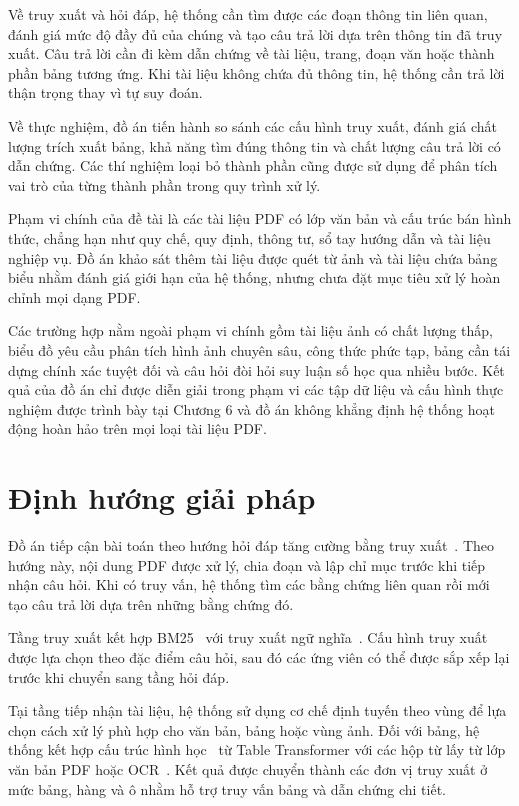 \documentclass[../DoAn.tex]{subfiles}
\begin{document}
Về truy xuất và hỏi đáp, hệ thống cần tìm được các đoạn thông tin liên quan, đánh giá mức độ đầy đủ của chúng và tạo câu trả lời dựa trên thông tin đã truy xuất. Câu trả lời cần đi kèm dẫn chứng về tài liệu, trang, đoạn văn hoặc thành phần bảng tương ứng. Khi tài liệu không chứa đủ thông tin, hệ thống cần trả lời thận trọng thay vì tự suy đoán.

Về thực nghiệm, đồ án tiến hành so sánh các cấu hình truy xuất, đánh giá chất lượng trích xuất bảng, khả năng tìm đúng thông tin và chất lượng câu trả lời có dẫn chứng. Các thí nghiệm loại bỏ thành phần cũng được sử dụng để phân tích vai trò của từng thành phần trong quy trình xử lý.

Phạm vi chính của đề tài là các tài liệu PDF có lớp văn bản và cấu trúc bán hình thức, chẳng hạn như quy chế, quy định, thông tư, sổ tay hướng dẫn và tài liệu nghiệp vụ. Đồ án khảo sát thêm tài liệu được quét từ ảnh và tài liệu chứa bảng biểu nhằm đánh giá giới hạn của hệ thống, nhưng chưa đặt mục tiêu xử lý hoàn chỉnh mọi dạng PDF.

Các trường hợp nằm ngoài phạm vi chính gồm tài liệu ảnh có chất lượng thấp, biểu đồ yêu cầu phân tích hình ảnh chuyên sâu, công thức phức tạp, bảng cần tái dựng chính xác tuyệt đối và câu hỏi đòi hỏi suy luận số học qua nhiều bước. Kết quả của đồ án chỉ được diễn giải trong phạm vi các tập dữ liệu và cấu hình thực nghiệm được trình bày tại Chương 6 và đồ án không khẳng định hệ thống hoạt động hoàn hảo trên mọi loại tài liệu PDF.

\section{Định hướng giải pháp}



Đồ án tiếp cận bài toán theo hướng hỏi đáp tăng cường bằng truy xuất~\cite{lewis2020rag}. Theo hướng này, nội dung PDF được xử lý, chia đoạn và lập chỉ mục trước khi tiếp nhận câu hỏi. Khi có truy vấn, hệ thống tìm các bằng chứng liên quan rồi mới tạo câu trả lời dựa trên những bằng chứng đó.

Tầng truy xuất kết hợp BM25~\cite{robertson2009bm25} với truy xuất ngữ nghĩa~\cite{karpukhin2020dpr}. Cấu hình truy xuất được lựa chọn theo đặc điểm câu hỏi, sau đó các ứng viên có thể được sắp xếp lại trước khi chuyển sang tầng hỏi đáp.

Tại tầng tiếp nhận tài liệu, hệ thống sử dụng cơ chế định tuyến theo vùng để lựa chọn cách xử lý phù hợp cho văn bản, bảng hoặc vùng ảnh. Đối với bảng, hệ thống kết hợp cấu trúc hình học~\cite{smock2022pubtables} từ Table Transformer với các hộp từ lấy từ lớp văn bản PDF hoặc OCR~\cite{du2020ppocr}. Kết quả được chuyển thành các đơn vị truy xuất ở mức bảng, hàng và ô nhằm hỗ trợ truy vấn bảng và dẫn chứng chi tiết.
\end{document}
